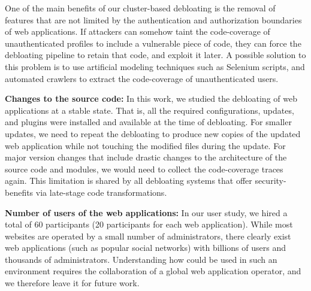 One of the main benefits of our cluster-based debloating is the removal of features that are not limited by the authentication and authorization boundaries of web applications. 
If attackers can somehow taint the code-coverage of unauthenticated profiles to include a vulnerable piece of code, they can force the debloating pipeline to retain that code, and exploit it later. 
A possible solution to this problem is to use artificial modeling techniques such as Selenium scripts, and automated crawlers to extract the code-coverage of unauthenticated users. 

\noindent\textbf{Changes to the source code:} 
In this work, we studied the debloating of web applications at a stable state. 
That is, all the required configurations, updates, and plugins were installed and available at the time of debloating. 
For smaller updates, we need to repeat the debloating to produce new copies of the updated web application while not touching the modified files during the update. 
For major version changes that include drastic changes to the architecture of the source code and modules, we would need to collect the code-coverage traces again. This limitation is shared by all debloating systems that offer security-benefits via late-stage code transformations.

\noindent\textbf{Number of users of the web applications:} 
In our user study, we hired a total of 60 participants (20 participants for each web application). 
While most websites are operated by a small number of administrators, there clearly exist web applications (such as popular social networks) with billions of users and thousands of administrators. 
Understanding how \dbltr{} could be used in such an environment requires the collaboration of a global web application operator, and we therefore leave it for future work.